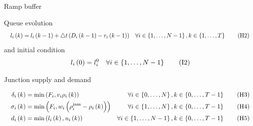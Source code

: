 \documentclass[xcolor=svgnames, english, smaller]{beamer}
\theoremstyle{plain}
\theoremstyle{definition}
\theoremstyle{plain}
\theoremstyle{plain}
\newcommand \Fontvi{\fontsize{8}{8}\selectfont}
\newcommand \systemDiagOffset{-1.8in}
\newcommand \systemDiagResizeMult{1.3}
\begin{document}
\begin{frame}{Ramp buffer}

\Fontvi

\begin{figure}[t]
\hspace{\systemDiagOffset}
\resizebox{\systemDiagResizeMult\columnwidth}{!}{}
\label{fig:system}
\end{figure}

Queue evolution
\begin{align}
&& l_{i}\left(k\right) & =l_{i}\left(k-1\right)+\triangle t\left(D_{i}\left(k-1\right)-r_{i}\left(k-1\right)\right) & \forall i\in\left\{ 1,\ldots,N-1\right\} ,k\in\left\{ 1,\ldots,T\right\}
\tag{H2}
\label{eq:rampConservation}
\end{align}
and initial condition
\begin{align}
&& l_{i}\left(0\right) & =l_{i}^{0} & \forall i\in\left\{ 1,\ldots,N-1\right\}
\tag{I2}\label{eq:rampInit}
\end{align}


\end{frame}

\begin{frame}{Junction supply and demand}

\Fontvi

\begin{figure}[t]
\hspace{\systemDiagOffset}
\resizebox{\systemDiagResizeMult\columnwidth}{!}{}
\label{fig:system}
\end{figure}

\begin{align}
&& \delta_{i}\left(k\right) & =\min\left(F_{i},v_{i}\rho_{i}\left(k\right)\right) & \forall i\in\left\{ 0,\ldots,N\right\} ,k\in\left\{ 0,\ldots,T-1\right\}
\tag{H3}
\label{eq:junctionDemand} \\
&& \sigma_{i}\left(k\right) & =\min\left(F_{i},w_{i}\left(\rho^{\text{jam}}_{i}-\rho_{i}\left(k\right)\right)\right) & \forall i\in\left\{ 1,\ldots,N\right\} ,k\in\left\{ 0,\ldots,T-1\right\} 
\tag{H4}
\label{eq:junctionSupply} \\
&& d_{i}\left(k\right) & =\min\left(l_{i}\left(k\right),u_{i}\left(k\right)\right) & \forall i\in\left\{ 1,\ldots,N-1\right\} ,k\in\left\{ 0,\ldots,T-1\right\} 
\tag{H5}
\label{eq:junctionRampDemand}
\end{align}
\end{frame}
\end{document}
